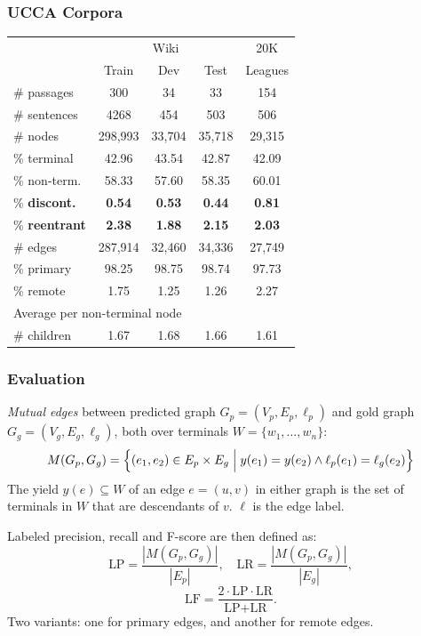 \documentclass[t]{beamer}
\begin{document}
\begin{frame}
\frametitle{UCCA Corpora}
\centering
\begin{tabular}{l|ccc|c}
	& \multicolumn{3}{c|}{Wiki} & 20K \\
	& \small Train & \small Dev & \small Test & Leagues \\
	\hline
	\# passages & 300 & 34 & 33 & 154 \\
	\# sentences & 4268 & 454 & 503 & 506 \\
	\hline
	\# nodes & 298,993 & 33,704 & 35,718 & 29,315 \\
	\% terminal & 42.96 & 43.54 & 42.87 & 42.09 \\
	\% non-term. & 58.33 & 57.60 & 58.35 & 60.01 \\
	\% \textbf{discont.} & \textbf{0.54} & \textbf{0.53} & \textbf{0.44} & \textbf{0.81} \\
	\% \textbf{reentrant} & \textbf{2.38} & \textbf{1.88} & \textbf{2.15} & \textbf{2.03} \\
	\hline
	\# edges & 287,914 & 32,460 & 34,336 & 27,749 \\
	\% primary & 98.25 & 98.75 & 98.74 & 97.73 \\
	\% remote & 1.75 & 1.25 & 1.26 & 2.27 \\
	\hline
	\multicolumn{3}{l}{\footnotesize Average per non-terminal node} \\
	\# children & 1.67 & 1.68 & 1.66 & 1.61 
\end{tabular}
\end{frame}

\begin{frame}
\frametitle{Evaluation}
\textit{Mutual edges} between predicted graph $G_p=(V_p,E_p,\ell_p)$
and gold graph $G_g=(V_g,E_g,\ell_g)$,
both over terminals $W = \{w_1,\ldots,w_n\}$:
\[
M(G_p,G_g) =
    \Bigl\{(e_1,e_2) \in E_p \times E_g \;\Big|\;
    y(e_1) = y(e_2) \wedge \ell_p(e_1)=\ell_g(e_2)\Bigr\}
\]
The yield $y(e) \subseteq W$ of an edge $e=(u,v)$ in either graph
is the set of terminals in $W$ that are descendants of $v$. \hfill
$\ell$ is the edge label.

\vfill
Labeled precision, recall and F-score are then defined as:
\[
\text{LP} = \frac{|M(G_p,G_g)|}{|E_p|},\quad
\text{LR} = \frac{|M(G_p,G_g)|}{|E_g|},
\]
\[
\text{LF} = \frac{2 \cdot \text{LP} \cdot \text{LR}}{\text{LP} + \text{LR}}.
\]
Two variants:
one for primary edges, and another for remote edges.
\end{frame}
\end{document}
